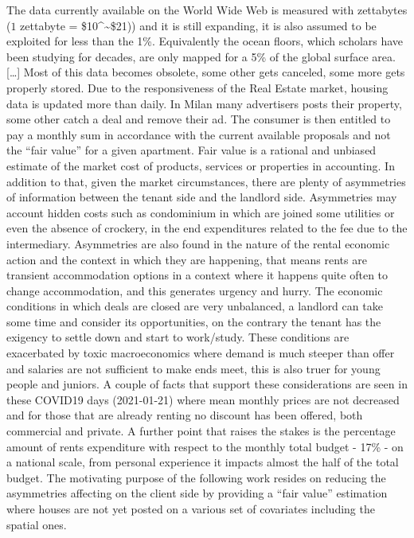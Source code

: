 \documentclass[
  12pt,
  a4paper,
  oneside]{book}
\theoremstyle{definition}
\theoremstyle{definition}
\theoremstyle{definition}
\theoremstyle{remark}
\begin{document}
The data currently available on the World Wide Web is measured with zettabytes (\(1\) zettabyte = \$10\^{}\textasciitilde\$21)) and it is still expanding, it is also assumed to be exploited for less than the 1\%. Equivalently the ocean floors, which scholars have been studying for decades, are only mapped for a 5\% of the global surface area. {[}\ldots{]} Most of this data becomes obsolete, some other gets canceled, some more gets properly stored. Due to the responsiveness of the Real Estate market, housing data is updated more than daily. In Milan many advertisers posts their property, some other catch a deal and remove their ad. The consumer is then entitled to pay a monthly sum in accordance with the current available proposals and not the ``fair value'' for a given apartment. Fair value is a rational and unbiased estimate of the market cost of products, services or properties in accounting. In addition to that, given the market circumstances, there are plenty of asymmetries of information between the tenant side and the landlord side. Asymmetries may account hidden costs such as condominium in which are joined some utilities or even the absence of crockery, in the end expenditures related to the fee due to the intermediary. Asymmetries are also found in the nature of the rental economic action and the context in which they are happening, that means rents are transient accommodation options in a context where it happens quite often to change accommodation, and this generates urgency and hurry. The economic conditions in which deals are closed are very unbalanced, a landlord can take some time and consider its opportunities, on the contrary the tenant has the exigency to settle down and start to work/study. These conditions are exacerbated by toxic macroeconomics where demand is much steeper than offer and salaries are not sufficient to make ends meet, this is also truer for young people and juniors. A couple of facts that support these considerations are seen in these COVID19 days (2021-01-21) where mean monthly prices are not decreased and for those that are already renting no discount has been offered, both commercial and private. A further point that raises the stakes is the percentage amount of rents expenditure with respect to the monthly total budget - 17\% - on a national scale, from personal experience it impacts almost the half of the total budget.
The motivating purpose of the following work resides on reducing the asymmetries affecting on the client side by providing a ``fair value'' estimation where houses are not yet posted on a various set of covariates including the spatial ones.
\end{document}
